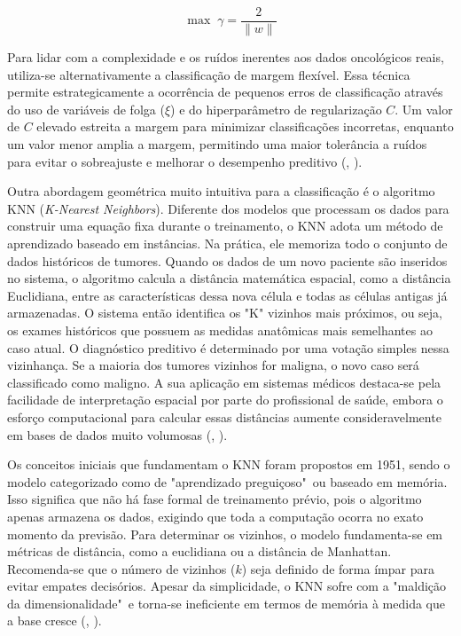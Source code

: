 \documentclass[
    12pt
    ,oneside
    ,a4paper
    ,chapter=TITLE
    ,section=TITLE
    ,sumario=abnt-6027-2012
    ,english,brazil]{abntex2} %
\begin{document}
\begin{equation}
\label{eq:margem_svm}
\max \; \gamma = \frac{2}{\|w\|}
\end{equation}

Para lidar com a complexidade e os ruídos inerentes aos dados oncológicos reais, utiliza-se alternativamente a classificação de margem flexível. Essa técnica permite estrategicamente a ocorrência de pequenos erros de classificação através do uso de variáveis de folga ($\xi$) e do hiperparâmetro de regularização $C$. Um valor de $C$ elevado estreita a margem para minimizar classificações incorretas, enquanto um valor menor amplia a margem, permitindo uma maior tolerância a ruídos para evitar o sobreajuste e melhorar o desempenho preditivo (, \citeyear{ibm_svm_2026}).

Outra abordagem geométrica muito intuitiva para a classificação é o algoritmo KNN (\textit{K-Nearest Neighbors}). Diferente dos modelos que processam os dados para construir uma equação fixa durante o treinamento, o KNN adota um método de aprendizado baseado em instâncias. Na prática, ele memoriza todo o conjunto de dados históricos de tumores. Quando os dados de um novo paciente são inseridos no sistema, o algoritmo calcula a distância matemática espacial, como a distância Euclidiana, entre as características dessa nova célula e todas as células antigas já armazenadas. O sistema então identifica os "K" vizinhos mais próximos, ou seja, os exames históricos que possuem as medidas anatômicas mais semelhantes ao caso atual. O diagnóstico preditivo é determinado por uma votação simples nessa vizinhança. Se a maioria dos tumores vizinhos for maligna, o novo caso será classificado como maligno. A sua aplicação em sistemas médicos destaca-se pela facilidade de interpretação espacial por parte do profissional de saúde, embora o esforço computacional para calcular essas distâncias aumente consideravelmente em bases de dados muito volumosas (, \citeyear{Faceli2011}).

Os conceitos iniciais que fundamentam o KNN foram propostos em 1951, sendo o modelo categorizado como de "aprendizado preguiçoso"\ ou baseado em memória. Isso significa que não há fase formal de treinamento prévio, pois o algoritmo apenas armazena os dados, exigindo que toda a computação ocorra no exato momento da previsão. Para determinar os vizinhos, o modelo fundamenta-se em métricas de distância, como a euclidiana ou a distância de Manhattan. Recomenda-se que o número de vizinhos ($k$) seja definido de forma ímpar para evitar empates decisórios. Apesar da simplicidade, o KNN sofre com a "maldição da dimensionalidade"\ e torna-se ineficiente em termos de memória à medida que a base cresce (, \citeyear{ibm_knn_2026}).
\end{document}
